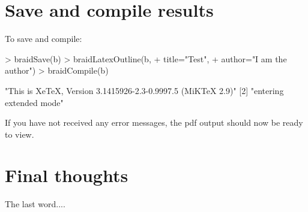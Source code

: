 \documentclass[a4paper]{article}
\begin{document}
\section{Save and compile results}

To save and compile:

\begin{Schunk}
\begin{Sinput}
> braidSave(b)
> braidLatexOutline(b,
+     title="Test",
+     author="I am the author")
> braidCompile(b)
\end{Sinput}
\begin{Soutput}
[1] "This is XeTeX, Version 3.1415926-2.3-0.9997.5 (MiKTeX 2.9)"
[2] "entering extended mode"                                    
\end{Soutput}
\end{Schunk}

If you have not received any error messages, the pdf output should now be ready to view.


\section{Final thoughts}

The last word....


\end{document}
